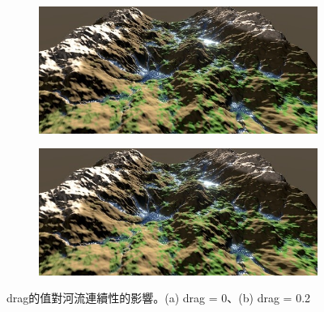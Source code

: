 \documentclass[a4paper, 12pt]{article}
\begin{document}
\begin{figure}[htbp]
    \begin{subfigure}{0.45\textwidth}
        \includegraphics[width=\linewidth]{fig/1a.jpg}
        \caption{} \label{fig:1a}
    \end{subfigure}%
    \hspace*{\fill}   %
    \begin{subfigure}{0.45\textwidth}
        \includegraphics[width=\linewidth]{fig/1a.jpg}
        \caption{} \label{fig:1b}
    \end{subfigure}%
    \caption{drag的值對河流連續性的影響。(a) drag = 0、(b) drag = 0.2} \label{fig:1}
\end{figure}
\end{document}
